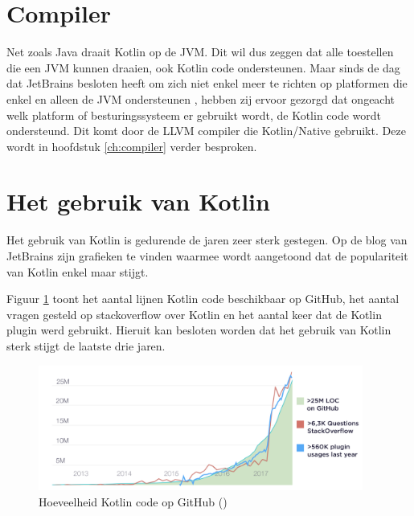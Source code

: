 \section{Compiler}
\label{sec:llvm}
Net zoals Java draait Kotlin op de JVM. Dit wil dus zeggen dat alle toestellen die een JVM kunnen draaien, ook Kotlin code ondersteunen. Maar sinds de dag dat JetBrains besloten heeft om zich niet enkel meer te richten op platformen die enkel en alleen de JVM ondersteunen \autocite{JetBrainsVM}, hebben zij ervoor gezorgd dat ongeacht welk platform of besturingssysteem er gebruikt wordt, de Kotlin code wordt ondersteund. Dit komt door de LLVM compiler die Kotlin/Native gebruikt. Deze wordt in hoofdstuk \ref{ch:compiler} verder besproken.

\section{Het gebruik van Kotlin}
\label{sec:kotlingebruik}
Het gebruik van Kotlin is gedurende de jaren zeer sterk gestegen. Op de blog van JetBrains \autocite{JetBrains12} zijn grafieken te vinden waarmee wordt aangetoond dat de populariteit van Kotlin enkel maar stijgt.

Figuur \ref{fig:kotlingithub} toont het aantal lijnen Kotlin code beschikbaar op GitHub, het aantal vragen gesteld op stackoverflow over Kotlin en het aantal keer dat de Kotlin plugin werd gebruikt. Hieruit kan besloten worden dat het gebruik van Kotlin sterk stijgt de laatste drie jaren.

\begin{figure} [ht]
	\centering
	\includegraphics[width=0.95\textwidth]{img/KotlinAdoption.png}
	\caption{Hoeveelheid Kotlin code op GitHub (\cite{JetBrains12})}
	\label{fig:kotlingithub}
\end{figure}

